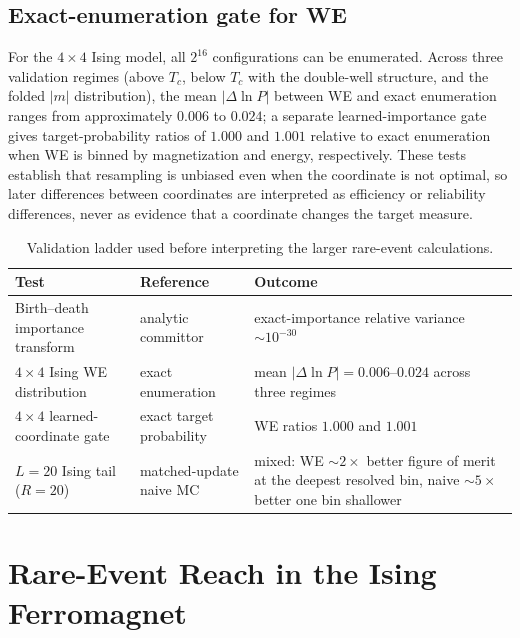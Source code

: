 \documentclass[a4paper,fleqn]{cas-sc}
\begin{document}
\subsection{Exact-enumeration gate for WE}\label{sec:gate}
For the $4\times4$ Ising model, all $2^{16}$ configurations can be enumerated. Across three
validation regimes (above $T_c$, below $T_c$ with the double-well structure, and the folded
$|m|$ distribution), the mean $|\Delta\ln P|$ between WE and exact enumeration ranges from
approximately $0.006$ to $0.024$; a separate learned-importance gate gives target-probability
ratios of $1.000$ and $1.001$ relative to exact enumeration when WE is binned by magnetization
and energy, respectively. These tests establish that resampling is unbiased even when the
coordinate is not optimal, so later differences between coordinates are interpreted as
efficiency or reliability differences, never as evidence that a coordinate changes the target
measure.

\begin{table}[H]
\centering\small
\caption{Validation ladder used before interpreting the larger rare-event calculations.}
\label{tab:ladder}
\begin{tabular}{p{}p{}p{}}
\toprule
Test & Reference & Outcome \\
\midrule
Birth--death importance transform & analytic committor & exact-importance relative variance
$\sim10^{-30}$ \\
$4\times4$ Ising WE distribution & exact enumeration & mean $|\Delta\ln P|=0.006$--$0.024$
across three regimes \\
$4\times4$ learned-coordinate gate & exact target probability & WE ratios $1.000$ and
$1.001$ \\
$L=20$ Ising tail ($R=20$) & matched-update naive MC & mixed: WE $\sim2\times$ better
figure of merit at the deepest resolved bin, naive $\sim5\times$ better one bin shallower \\
\bottomrule
\end{tabular}
\end{table}

\FloatBarrier

\section{Rare-Event Reach in the Ising Ferromagnet}\label{sec:tail}
\end{document}
